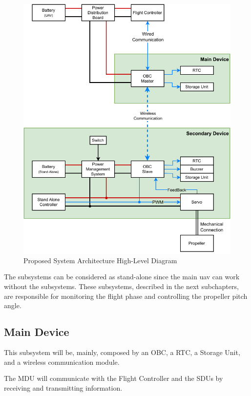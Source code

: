 \begin{figure}[H]
    \centering
    \includegraphics[scale=1]{ch3/assets/system_diagram.pdf}
    \caption{Proposed System Architecture High-Level Diagram}
    \label{fig:system_diagram}
\end{figure}

The subsystems can be considered as stand-alone since the main \gls{uav} can work without the subsystems.
These subsystems, described in the next subchapters, are responsible for monitoring the flight phase and controlling the propeller pitch angle.

\subsection{Main Device}
This subsystem will be, mainly, composed by an \gls{OBC}, a \gls{RTC}, a Storage Unit, and a wireless communication module.

The MDU will communicate with the Flight Controller and the SDUs by receiving and transmitting information.

